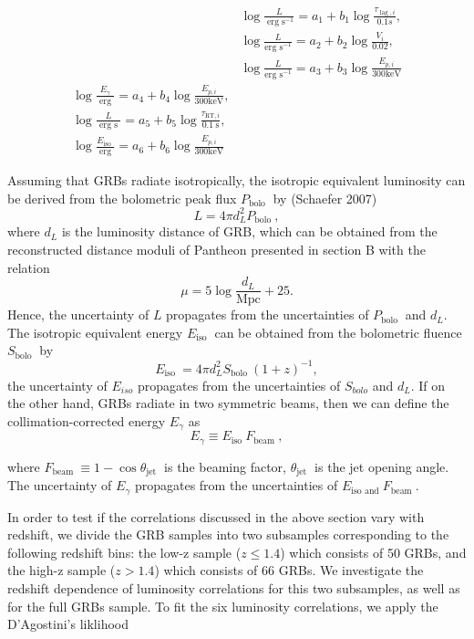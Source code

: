 \begin{align}
& \log \frac{L}{\operatorname{erg} \mathrm{s}^{-1}}=a_{1}+b_{1} \log \frac{\tau_{\operatorname{lag}, i}}{0.1 s}, \\
& \log \frac{L}{\operatorname{erg~s}^{-1}}=a_{2}+b_{2} \log \frac{V_{i}}{0.02}, \\
& \log \frac{L}{\operatorname{erg~s}^{-1}}=a_{3}+b_{3} \log \frac{E_{p, i}}{300 \mathrm{keV}}\\
\log \frac{E_{\gamma}}{\text { erg }}=a_{4}+b_{4} \log \frac{E_{p, i}}{300 \mathrm{keV}}, \\
\log \frac{L}{\text { erg s }}=a_{5}+b_{5} \log \frac{\tau_{\mathrm{RT}, i}}{0.1 \mathrm{~s}}, \\
\log \frac{E_{\text {iso }}}{\text { erg }}=a_{6}+b_{6} \log \frac{E_{p, i}}{300 \mathrm{keV}}
\end{align}

Assuming that GRBs radiate isotropically, the isotropic equivalent luminosity can be derived from the bolometric peak flux $P_{\text {bolo }}$ by (Schaefer 2007)
$$
L=4 \pi d_{L}^{2} P_{\text {bolo }},
$$
where $d_{L}$ is the luminosity distance of GRB, which can be obtained from the reconstructed distance moduli of Pantheon presented in section B with the relation
$$
\mu=5 \log \frac{d_{L}}{\mathrm{Mpc}}+25 .
$$
Hence, the uncertainty of $L$ propagates from the uncertainties of $P_{\text {bolo }}$ and $d_{L}$. The isotropic equivalent energy $E_{\text {iso }}$ can be obtained from the bolometric fluence $S_{\text {bolo }}$ by
$$
E_{\text {iso }}=4 \pi d_{L}^{2} S_{\text {bolo }}(1+z)^{-1},
$$
the uncertainty of $E_{iso}$ propagates from the uncertainties of $S_{bolo}$ and $d_L$. If on the other hand, GRBs radiate in two symmetric beams, then we can define the collimation-corrected energy $E_{\gamma}$ as
$$
E_{\gamma} \equiv E_{\text {iso }} F_{\text {beam }},
$$

where $F_{\text {beam }} \equiv 1-\cos \theta_{\text {jet }}$ is the beaming factor, $\theta_{\text {jet }}$ is the jet opening angle. The uncertainty of $E_{\gamma}$ propagates from the uncertainties of $E_{\text {iso and }} F_{\text {beam }}$.

In order to test if the correlations discussed in the above
section vary with redshift, we divide the GRB samples
into two subsamples corresponding to the following redshift
bins: the low-z sample ($z \leq 1.4$) which consists of 50 GRBs, and the high-z sample ($z > 1.4$) which consists of 66 GRBs. We investigate the redshift dependence of luminosity correlations for this two subsamples, as well as for the full GRBs sample. To fit the six luminosity correlations, we apply the D’Agostini’s liklihood\cite{d2005fits}


